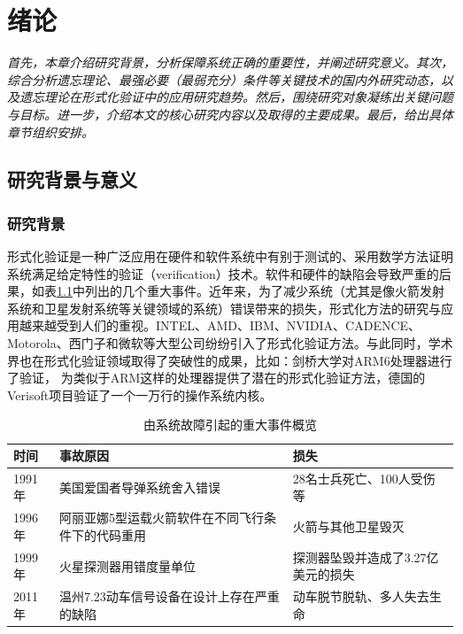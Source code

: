 \chapter{绪论}\label{chapter01}
{\em 首先，本章介绍研究背景，分析保障系统正确的重要性，并阐述研究意义。其次，综合分析遗忘理论、最强必要（最弱充分）条件等关键技术的国内外研究动态，以及遗忘理论在形式化验证中的应用研究趋势。然后，围绕研究对象凝练出关键问题与目标。进一步，介绍本文的核心研究内容以及取得的主要成果。最后，给出具体章节组织安排。}
\section{研究背景与意义}
\subsection{研究背景}

形式化验证是一种广泛应用在硬件\cite{lam2007,lv2000,jani2007Verilog}和软件系统中\cite{yuan2008,gu2005}有别于测试的、采用数学方法证明系统满足给定特性的验证（verification）技术。软件和硬件的缺陷会导致严重的后果，如表\ref{tab:systemEvents_1.1}中列出的几个重大事件。近年来，为了减少系统（尤其是像火箭发射系统和卫星发射系统等关键领域的系统）错误带来的损失，形式化方法的研究与应用越来越受到人们的重视。INTEL、AMD、IBM、NVIDIA、CADENCE、 Motorola、西门子和微软等大型公司纷纷引入了形式化验证方法。与此同时，学术界也在形式化验证领域取得了突破性的成果，比如：剑桥大学对ARM6处理器进行了验证\cite{DBLP:conf/tphol/Fox03}， 为类似于ARM这样的处理器提供了潜在的形式化验证方法，德国的Verisoft项目验证了一个一万行的操作系统内核\cite{DBLP:conf/sefm/DaumSS09}。

\begin{table}[htbp]
\caption{由系统故障引起的重大事件概览}
\label{tab:systemEvents_1.1}
\centering
\fontsize{10pt}{\baselineskip}\selectfont
\begin{tabular}{p{}p{}p{}}%
	\toprule
	\textbf{时间}&\textbf{事故原因}&\textbf{损失}\\
	\midrule
    1991年 & 美国爱国者导弹系统舍入错误 & 28名士兵死亡、100人受伤等\\
	1996年 & 阿丽亚娜5型运载火箭软件在不同飞行条件下的代码重用 & 火箭与其他卫星毁灭\\
	1999年 & 火星探测器用错度量单位 & 探测器坠毁并造成了3.27亿美元的损失\\
	2011年 & 温州7.23动车信号设备在设计上存在严重的缺陷 &动车脱节脱轨、多人失去生命\\
	
\bottomrule
\end{tabular}
\end{table}


